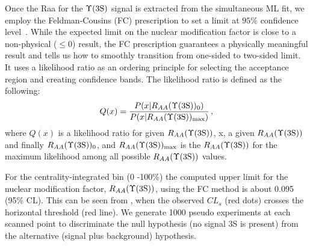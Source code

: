 
Once the Raa for the $\Upsilon\mathrm{(3S)}$ signal is extracted from the simultaneous ML fit, 
we employ the Feldman-Cousins (FC) prescription to set a limit at $95\%$ confidence level~\cite{MCMC}. 
While the expected limit on the nuclear modification factor is close to a
 non-physical ($\leq 0$) result, %
the FC prescription guarantees a physically meaningful result and tells us how to smoothly 
transition from one-sided to two-sided limit. 
It uses a likelihood ratio as an ordering principle for selecting the acceptance
 region and creating confidence bands. The likelihood ratio is defined as the following:
\begin{equation}
Q(x)=\frac{P(x|R_{AA}(\Upsilon\mathrm{(3S)})_{0})}{P(x|R_{AA}(\Upsilon\mathrm{(3S)})_{\text{max}})} \,,
\end{equation}
where $Q(x)$ is a likelihood ratio for given $R_{AA}(\Upsilon\mathrm{(3S)})$, x,  a given $R_{AA}(\Upsilon\mathrm{(3S)})$ and finally $R_{AA}(\Upsilon\mathrm{(3S)})_{0}$,
and $R_{AA}(\Upsilon\mathrm{(3S)})_{\text{max}}$ is the $R_{AA}(\Upsilon\mathrm{(3S)})$ for the maximum likelihood among all possible $R_{AA}(\Upsilon\mathrm{(3S)})$ values.



For the centrality-integrated bin (0 -100\%) the computed upper limit for the nuclear modification factor, $R_{AA}(\Upsilon\mathrm{(3S)})$, using the FC method is about 0.095 (95\% CL). This can be seen from , when the observed $CL_s$ (red dots) crosses the horizontal threshold (red line). We generate 1000 pseudo experiments at each scanned point to discriminate the null hypothesis (no signal 3S is present) from the alternative (signal plus background) hypothesis.

